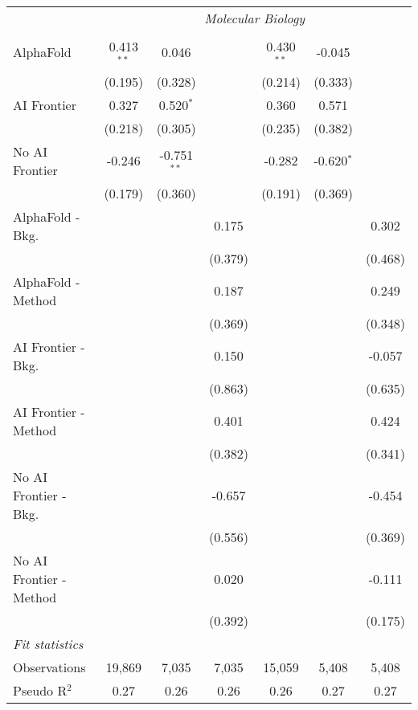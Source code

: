 \begin{tabular}{lcccccc}
 & \multicolumn{6}{c}{\textit{Molecular Biology}} \\ \\
   AlphaFold               & 0.413$^{**}$ & 0.046         &         & 0.430$^{**}$ & -0.045       &   \\   
                           & (0.195)      & (0.328)       &         & (0.214)      & (0.333)      &   \\   
   AI Frontier             & 0.327        & 0.520$^{*}$   &         & 0.360        & 0.571        &   \\   
                           & (0.218)      & (0.305)       &         & (0.235)      & (0.382)      &   \\   
   No AI Frontier          & -0.246       & -0.751$^{**}$ &         & -0.282       & -0.620$^{*}$ &   \\   
                           & (0.179)      & (0.360)       &         & (0.191)      & (0.369)      &   \\   
   AlphaFold - Bkg.        &              &               & 0.175   &              &              & 0.302\\   
                           &              &               & (0.379) &              &              & (0.468)\\   
   AlphaFold - Method      &              &               & 0.187   &              &              & 0.249\\   
                           &              &               & (0.369) &              &              & (0.348)\\   
   AI Frontier - Bkg.      &              &               & 0.150   &              &              & -0.057\\   
                           &              &               & (0.863) &              &              & (0.635)\\   
   AI Frontier - Method    &              &               & 0.401   &              &              & 0.424\\   
                           &              &               & (0.382) &              &              & (0.341)\\   
   No AI Frontier - Bkg.   &              &               & -0.657  &              &              & -0.454\\   
                           &              &               & (0.556) &              &              & (0.369)\\   
   No AI Frontier - Method &              &               & 0.020   &              &              & -0.111\\   
                           &              &               & (0.392) &              &              & (0.175)\\   
   \midrule
   \emph{Fit statistics}\\
   Observations            & 19,869       & 7,035         & 7,035   & 15,059       & 5,408        & 5,408\\  
   Pseudo R$^2$            & 0.27         & 0.26          & 0.26    & 0.26         & 0.27         & 0.27\\  
   

\end{tabular}
